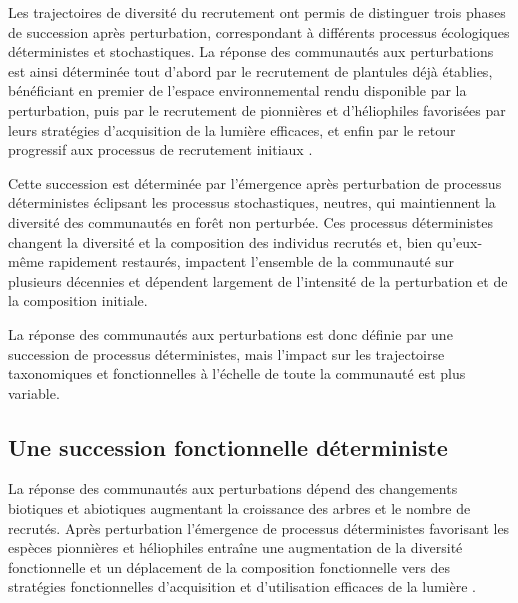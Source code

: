 \documentclass[
  11pt,
  french,
  A4paper,
  extrafontsizes,onecolumn,openright
  ]{memoir}
\begin{document}
Les trajectoires de diversité du recrutement ont permis de distinguer
trois phases de succession après perturbation, correspondant à
différents processus écologiques déterministes et stochastiques. La
réponse des communautés aux perturbations est ainsi déterminée tout
d'abord par le recrutement de plantules déjà établies, bénéficiant en
premier de l'espace environnemental rendu disponible par la
perturbation, puis par le recrutement de pionnières et d'héliophiles
favorisées par leurs stratégies d'acquisition de la lumière efficaces,
et enfin par le retour progressif aux processus de recrutement initiaux
\autocites{Denslow2000}{Herault2010}{Herault2011}.

Cette succession est déterminée par l'émergence après perturbation de
processus déterministes éclipsant les processus stochastiques, neutres,
qui maintiennent la diversité des communautés en forêt non perturbée.
Ces processus déterministes changent la diversité et la composition des
individus recrutés et, bien qu'eux-même rapidement restaurés, impactent
l'ensemble de la communauté sur plusieurs décennies et dépendent
largement de l'intensité de la perturbation et de la composition
initiale.

La réponse des communautés aux perturbations est donc définie par une
succession de processus déterministes, mais l'impact sur les
trajectoirse taxonomiques et fonctionnelles à l'échelle de toute la
communauté est plus variable.

\subsection{Une succession fonctionnelle
déterministe}\label{une-succession-fonctionnelle-deterministe}

La réponse des communautés aux perturbations dépend des changements
biotiques et abiotiques augmentant la croissance des arbres et le nombre
de recrutés. Après perturbation l'émergence de processus déterministes
favorisant les espèces pionnières et héliophiles entraîne une
augmentation de la diversité fonctionnelle et un déplacement de la
composition fonctionnelle vers des stratégies fonctionnelles
d'acquisition et d'utilisation efficaces de la lumière
\autocites{Violle2007b}{Baraloto2012a}.
\end{document}
